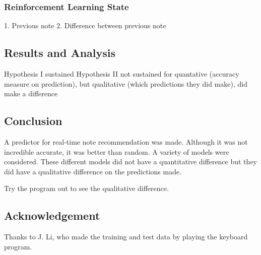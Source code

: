 \documentclass{article}
\begin{document}
\subsubsection*{Reinforcement Learning State}
1. Previous note
2. Difference between previous note

\subsection*{Results and Analysis}
Hypothesis I sustained
Hypothesis II not sustained for quantative (accuracy measure on prediction), but qualitative (which predictions they did make), did make a difference

\subsection*{Conclusion}
A predictor for real-time note recommendation was made. Although it was not incredible accurate, it was better than random. A variety of models were considered. These different models did not have a quantitative difference but they did have a qualitative difference on the predictions made.

Try the program out to see the qualitative difference.

\subsection*{Acknowledgement}
Thanks to J. Li, who made the training and test data by playing the keyboard program.
\end{document}
